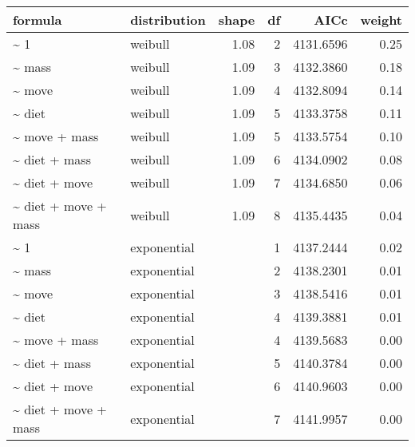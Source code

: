\begin{table}[ht]
\centering
\begin{tabular}{llrrrr}
 formula & distribution & shape & df & AICc & weight \\ 
  \hline
\~{} 1 & weibull & 1.08 & 2 & 4131.6596 & 0.25 \\ 
  \~{} mass & weibull & 1.09 & 3 & 4132.3860 & 0.18 \\ 
  \~{} move & weibull & 1.09 & 4 & 4132.8094 & 0.14 \\ 
  \~{} diet & weibull & 1.09 & 5 & 4133.3758 & 0.11 \\ 
  \~{} move + mass & weibull & 1.09 & 5 & 4133.5754 & 0.10 \\ 
  \~{} diet + mass & weibull & 1.09 & 6 & 4134.0902 & 0.08 \\ 
  \~{} diet + move & weibull & 1.09 & 7 & 4134.6850 & 0.06 \\ 
  \~{} diet + move + mass & weibull & 1.09 & 8 & 4135.4435 & 0.04 \\ 
  \~{} 1 & exponential &  & 1 & 4137.2444 & 0.02 \\ 
  \~{} mass & exponential &  & 2 & 4138.2301 & 0.01 \\ 
  \~{} move & exponential &  & 3 & 4138.5416 & 0.01 \\ 
  \~{} diet & exponential &  & 4 & 4139.3881 & 0.01 \\ 
  \~{} move + mass & exponential &  & 4 & 4139.5683 & 0.00 \\ 
  \~{} diet + mass & exponential &  & 5 & 4140.3784 & 0.00 \\ 
  \~{} diet + move & exponential &  & 6 & 4140.9603 & 0.00 \\ 
  \~{} diet + move + mass & exponential &  & 7 & 4141.9957 & 0.00 \\ 
  \end{tabular}
\label{tab:nag}
\end{table}
